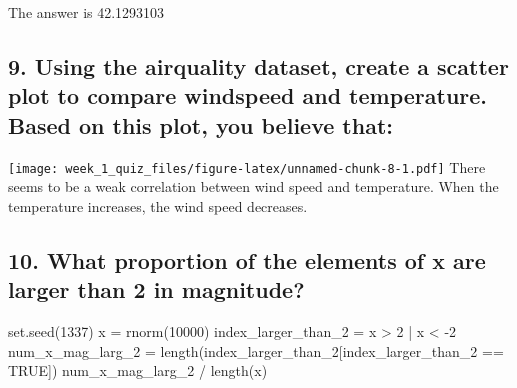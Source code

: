\documentclass[
]{article}
\newenvironment{Shaded}{\begin{snugshade}}{\end{snugshade}}
\newcommand{\ConstantTok}[1]{\textcolor[rgb]{0.00,0.00,0.00}{#1}}
\newcommand{\DecValTok}[1]{\textcolor[rgb]{0.00,0.00,0.81}{#1}}
\newcommand{\FunctionTok}[1]{\textcolor[rgb]{0.00,0.00,0.00}{#1}}
\newcommand{\NormalTok}[1]{#1}
\newcommand{\OtherTok}[1]{\textcolor[rgb]{0.56,0.35,0.01}{#1}}
\newcommand{\SpecialCharTok}[1]{\textcolor[rgb]{0.00,0.00,0.00}{#1}}
\begin{document}
The answer is 42.1293103

\hypertarget{using-the-airquality-dataset-create-a-scatter-plot-to-compare-windspeed-and-temperature.-based-on-this-plot-you-believe-that}{%
\subsection{9. Using the airquality dataset, create a scatter plot to
compare windspeed and temperature. Based on this plot, you believe
that:}\label{using-the-airquality-dataset-create-a-scatter-plot-to-compare-windspeed-and-temperature.-based-on-this-plot-you-believe-that}}

\begin{Shaded}
\end{Shaded}

\texttt{[image: week\_1\_quiz\_files/figure-latex/unnamed-chunk-8-1.pdf]}
There seems to be a weak correlation between wind speed and temperature.
When the temperature increases, the wind speed decreases.

\hypertarget{what-proportion-of-the-elements-of-x-are-larger-than-2-in-magnitude}{%
\subsection{10. What proportion of the elements of x are larger than 2
in
magnitude?}\label{what-proportion-of-the-elements-of-x-are-larger-than-2-in-magnitude}}

\begin{Shaded}
\begin{Highlighting}[]
\FunctionTok{set.seed}\NormalTok{(}\DecValTok{1337}\NormalTok{)}
\NormalTok{x }\OtherTok{=} \FunctionTok{rnorm}\NormalTok{(}\DecValTok{10000}\NormalTok{)}
\NormalTok{index\_larger\_than\_2 }\OtherTok{=}\NormalTok{ x }\SpecialCharTok{\textgreater{}} \DecValTok{2} \SpecialCharTok{|}\NormalTok{ x }\SpecialCharTok{\textless{}} \SpecialCharTok{{-}}\DecValTok{2}
\NormalTok{num\_x\_mag\_larg\_2 }\OtherTok{=} \FunctionTok{length}\NormalTok{(index\_larger\_than\_2[index\_larger\_than\_2 }\SpecialCharTok{==} \ConstantTok{TRUE}\NormalTok{])}
\NormalTok{num\_x\_mag\_larg\_2 }\SpecialCharTok{/} \FunctionTok{length}\NormalTok{(x)}
\end{Highlighting}
\end{Shaded}
\end{document}
